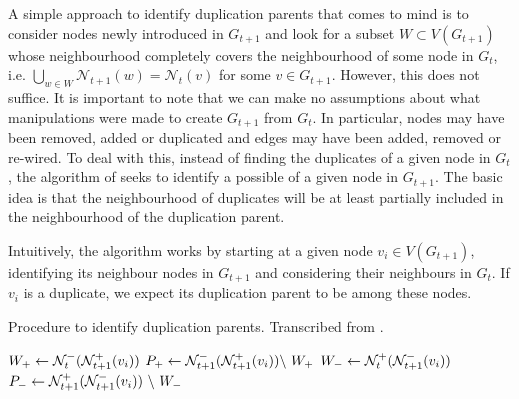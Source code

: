 \documentclass[
	fontsize=10pt, %
	twoside=false, %
	secnumdepth=1, %
  toc=indentunnumbered %
]{kaobook}
\begin{document}
A simple approach to identify duplication parents that comes to mind is to
consider nodes newly introduced in $G_{t+1}$ and look for a subset $W \subset
V(G_{t+1})$ whose neighbourhood completely covers the neighbourhood of some node
in $G_{t}$, i.e. $\bigcup_{w \in W} \mathcal{N}_{t+1}(w) = \mathcal{N}_t(v)$ for
some $v \in G_{t+1}$. However, this does not suffice. It is important to note
that we can make no assumptions about what manipulations were made to create
$G_{t+1}$ from $G_t$. In particular, nodes may have been removed, added or
duplicated and edges may have been added, removed or re-wired.
%
To deal with this, instead of finding the duplicates of a given node in
$G_{t}$, the algorithm of \nielsen{} seeks to identify a possible  of
a given node in $G_{t+1}$. The basic idea is that the neighbourhood of
duplicates will be at least partially included in the neighbourhood of the
duplication parent.

Intuitively, the algorithm works by starting at a given node $v_i \in
V(G_{t+1})$, identifying its neighbour nodes in $G_{t+1}$ and considering their
neighbours in $G_t$. If $v_i$ is a duplicate, we expect its duplication parent
to be among these nodes.

\begin{algorithm}[h]
  \DontPrintSemicolon
  \label{alg:identify-duplicates}
  \caption{ Procedure to identify duplication parents. Transcribed from
    \citeauthor{nielsen_MachineLearningSupport_2019} \cite{nielsen_MachineLearningSupport_2019}.
  }
     $W_+ \gets \mathcal{N}_t^- ( \mathcal{N}_{t+1}^+(v_i) )$ \; $P_+ \gets
  \mathcal{N}_{t+1}^- ( \mathcal{N}_{t+1}^+(v_i) ) \backslash~ W_+$ \; $W_- \gets
  \mathcal{N}_t^+ ( \mathcal{N}_{t+1}^-(v_i) ) $ \; $P_- \gets \mathcal{N}_{t+1}^+ (
  \mathcal{N}_{t+1}^-(v_i) ) ~\backslash~ W_- $\;
\end{algorithm}
\end{document}
